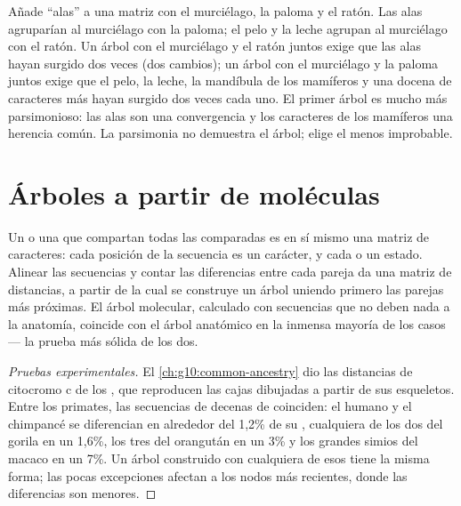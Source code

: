 \begin{example}\label{ex:g12:phylogenetic-trees:parsimony}
Añade ``alas'' a una matriz con el murciélago, la paloma y el ratón.
Las alas agruparían al murciélago con la paloma; el pelo y la leche
agrupan al murciélago con el ratón. Un árbol con el murciélago y el
ratón juntos exige que las alas hayan surgido dos veces (dos cambios);
un árbol con el murciélago y la paloma juntos exige que el pelo, la
leche, la mandíbula de los mamíferos y una docena de caracteres más
hayan surgido dos veces cada uno. El primer árbol es mucho más
parsimonioso: las alas son una convergencia y los caracteres de los
mamíferos una herencia común. La parsimonia no demuestra el árbol;
elige el menos improbable.
\end{example}

\section{Árboles a partir de moléculas}

\begin{proposition}\label{prop:g12:phylogenetic-trees:molecular}
Un  o una  que compartan todas las  comparadas es en
sí mismo una matriz de caracteres: cada posición de la secuencia es un
carácter, y cada  o  un estado. Alinear las
secuencias y contar las diferencias entre cada pareja da una matriz de
distancias, a partir de la cual se construye un árbol uniendo primero
las parejas más próximas. El árbol molecular, calculado con secuencias
que no deben nada a la anatomía, coincide con el árbol anatómico en la
inmensa mayoría de los casos --- la prueba más sólida de los dos.
\end{proposition}
\begin{proof}[Pruebas experimentales]
El \cref{ch:g10:common-ancestry} dio las distancias de citocromo c de
los , que reproducen las cajas dibujadas a partir de sus
esqueletos. Entre los primates, las secuencias de decenas de 
coinciden: el humano y el chimpancé se diferencian en alrededor del
1,2\% de su , cualquiera de los dos del gorila en un 1,6\%, los tres
del orangután en un 3\% y los grandes simios del macaco en un 7\%. Un
árbol construido con cualquiera de esos  tiene la misma forma; las
pocas excepciones afectan a los nodos más recientes, donde las
diferencias son menores.
\end{proof}

